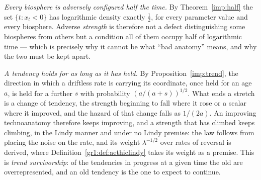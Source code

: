 \emph{Every biosphere is adversely configured half the time.} By
Theorem~\ref{imp:half} the set $\{t:x_t<0\}$ has logarithmic density
exactly $\tfrac12$, for every parameter value and every biosphere.
Adverse \emph{strength} is therefore not a defect distinguishing some
biospheres from others but a condition all of them occupy half of
logarithmic time --- which is precisely why it cannot be what
``bad anatomy'' means, and why the two must be kept apart.

\emph{A tendency holds for as long as it has held.} By
Proposition~\ref{imp:trend}, the direction in which a driftless rate is
carrying its coordinate, once held for an age $a$, is held for a further
$s$ with probability $(a/(a+s))^{1/2}$. What ends a stretch is a change of
tendency, the strength beginning to fall where it rose or a scalar where
it improved, and the hazard of that change falls as $1/(2a)$. An improving
technoanatomy therefore keeps improving, and a strength that has climbed
keeps climbing, in the Lindy manner and under no Lindy premise: the law
follows from placing the noise on the rate, and its weight
$\lambda^{-1/2}$ over rates of reversal is derived, where
Definition~\ref{gr1:def:aethiclindy} takes its weight as a premise. This
is \emph{trend survivorship}: of the tendencies in progress at a given
time the old are overrepresented, and an old tendency is the one to
expect to continue.

